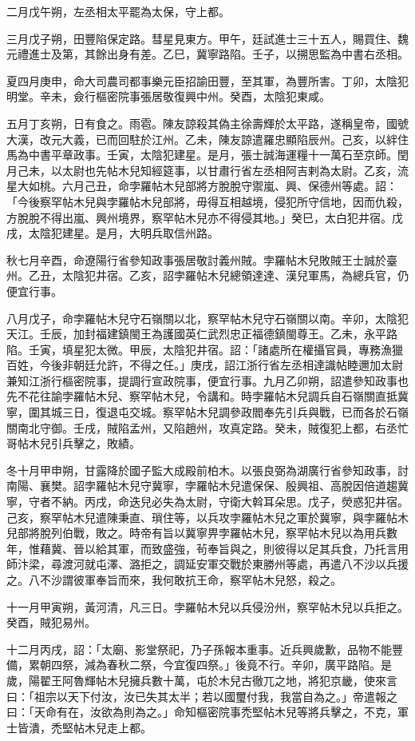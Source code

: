 \begin{pinyinscope}
 二月戊午朔，左丞相太平罷為太保，守上都。



 三月戊子朔，田豐陷保定路。彗星見東方。甲午，廷試進士三十五人，賜買住、魏元禮進士及第，其餘出身有差。乙巳，冀寧路陷。壬子，以搠思監為中書右丞相。



 夏四月庚申，命大司農司都事樂元臣招諭田豐，至其軍，為豐所害。丁卯，太陰犯明堂。辛未，僉行樞密院事張居敬復興中州。癸酉，太陰犯東咸。



 五月丁亥朔，日有食之。雨雹。陳友諒殺其偽主徐壽輝於太平路，遂稱皇帝，國號大漢，改元大義，已而回駐於江州。乙未，陳友諒遣羅忠顯陷辰州。己亥，以絆住馬為中書平章政事。壬寅，太陰犯建星。是月，張士誠海運糧十一萬石至京師。閏月己未，以太尉也先帖木兒知經筵事，以甘肅行省左丞相阿吉剌為太尉。乙亥，流星大如桃。六月己丑，命孛羅帖木兒部將方脫脫守禦嵐、興、保德州等處。詔：「今後察罕帖木兒與孛羅帖木兒部將，毋得互相越境，侵犯所守信地，因而仇殺，方脫脫不得出嵐、興州境界，察罕帖木兒亦不得侵其地。」癸巳，太白犯井宿。戊戌，太陰犯建星。是月，大明兵取信州路。



 秋七月辛酉，命遼陽行省參知政事張居敬討義州賊。孛羅帖木兒敗賊王士誠於臺州。乙丑，太陰犯井宿。乙亥，詔孛羅帖木兒總領達達、漢兒軍馬，為總兵官，仍便宜行事。



 八月戊子，命孛羅帖木兒守石嶺關以北，察罕帖木兒守石嶺關以南。辛卯，太陰犯天江。壬辰，加封福建鎮閩王為護國英仁武烈忠正福德鎮閩尊王。乙未，永平路陷。壬寅，填星犯太微。甲辰，太陰犯井宿。詔：「諸處所在權攝官員，專務漁獵百姓，今後非朝廷允許，不得之任。」庚戌，詔江浙行省左丞相達識帖睦邇加太尉兼知江浙行樞密院事，提調行宣政院事，便宜行事。九月乙卯朔，詔遣參知政事也先不花往諭孛羅帖木兒、察罕帖木兒，令講和。時孛羅帖木兒調兵自石嶺關直抵冀寧，圍其城三日，復退屯交城。察罕帖木兒調參政閻奉先引兵與戰，已而各於石嶺關南北守御。壬戌，賊陷孟州，又陷趙州，攻真定路。癸未，賊復犯上都，右丞忙哥帖木兒引兵擊之，敗績。



 冬十月甲申朔，甘露降於國子監大成殿前柏木。以張良弼為湖廣行省參知政事，討南陽、襄樊。詔孛羅帖木兒守冀寧，孛羅帖木兒遣保保、殷興祖、高脫因倍道趨冀寧，守者不納。丙戌，命迭兒必失為太尉，守衛大斡耳朵思。戊子，熒惑犯井宿。己亥，察罕帖木兒遣陳秉直、瑣住等，以兵攻孛羅帖木兒之軍於冀寧，與孛羅帖木兒部將脫列伯戰，敗之。時帝有旨以冀寧畀孛羅帖木兒，察罕帖木兒以為用兵數年，惟藉冀、晉以給其軍，而致盛強，茍奉旨與之，則彼得以足其兵食，乃托言用師汴梁，尋渡河就屯澤、潞拒之，調延安軍交戰於東勝州等處，再遣八不沙以兵援之。八不沙謂彼軍奉旨而來，我何敢抗王命，察罕帖木兒怒，殺之。



 十一月甲寅朔，黃河清，凡三日。孛羅帖木兒以兵侵汾州，察罕帖木兒以兵拒之。癸酉，賊犯易州。



 十二月丙戌，詔：「太廟、影堂祭祀，乃子孫報本重事。近兵興歲歉，品物不能豐備，累朝四祭，減為春秋二祭，今宜復四祭。」後竟不行。辛卯，廣平路陷。是歲，陽翟王阿魯輝帖木兒擁兵數十萬，屯於木兒古徹兀之地，將犯京畿，使來言曰：「祖宗以天下付汝，汝已失其太半；若以國璽付我，我當自為之。」帝遣報之曰：「天命有在，汝欲為則為之。」命知樞密院事禿堅帖木兒等將兵擊之，不克，軍士皆潰，禿堅帖木兒走上都。



\end{pinyinscope}